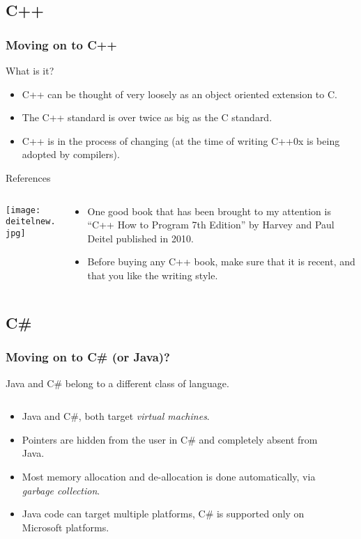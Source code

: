 \documentclass[smaller,table]{beamer} %
\begin{document}
\subsection{C++}
\begin{frame}
\frametitle{Moving on to C++}
\begin{block}{What is it?}
\begin{itemize}
\item C++ can be thought of very loosely as an object oriented extension to C.
\item The C++ standard is over twice as big as the C standard.
\item C++ is in the process of changing (at the time of writing C++0x is being adopted by compilers).
\end{itemize}
\end{block}
\begin{exampleblock}{References}
\begin{columns}
\begin{column}{1.7cm}
\texttt{[image: deitelnew.jpg]}
\end{column}
\begin{column}{8cm}
\begin{itemize}
\item One good book that has been brought to my attention is ``C++ How to Program 7th Edition'' by Harvey and Paul Deitel published in 2010.
\item Before buying any C++ book, make sure that it is recent, and that you like the writing style.
\end{itemize}
\end{column}
\end{columns}
\end{exampleblock}
\end{frame}

\subsection{C\#}
\begin{frame}
\frametitle{Moving on to C\# (or Java)?}
Java and C\# belong to a different class of language.
\begin{columns}
\begin{column}{0.55\textwidth}
\begin{itemize}
\item Java and C\#, both target \emph{virtual machines}.
\item Pointers are hidden from the user in C\# and completely absent from Java.
\item Most memory allocation and de-allocation is done automatically, via
\emph{garbage collection}.
\item Java code can target multiple platforms,
C\# is supported only on Microsoft platforms.
\end{itemize}
\end{column}
\begin{column}{0.7\textwidth}
\hspace{-0.57in}
\end{column}
\end{columns}
\end{frame}
\end{document}
